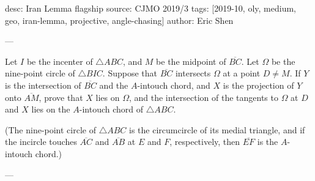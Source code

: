 desc: Iran Lemma flagship
source: CJMO 2019/3
tags: [2019-10, oly, medium, geo, iran-lemma, projective, angle-chasing]
author: Eric Shen

---

Let $I$ be the incenter of $\triangle ABC$, and $M$ be the midpoint of $\overline{BC}$. Let $\Omega$ be the nine-point circle of $\triangle BIC$. Suppose that $\overline{BC}$ intersects $\Omega$ at a point $D\ne M$. If $Y$ is the intersection of $\overline{BC}$ and the $A$-intouch chord, and $X$ is the projection of $Y$ onto $\overline{AM}$, prove that $X$ lies on $\Omega$, and the intersection of the tangents to $\Omega$ at $D$ and $X$ lies on the $A$-intouch chord of $\triangle ABC$.

(The nine-point circle of $\triangle ABC$ is the circumcircle of its medial triangle, and if the incircle touches $\overline{AC}$ and $\overline{AB}$ at $E$ and $F$, respectively, then $\overline{EF}$ is the $A$-intouch chord.)

---

